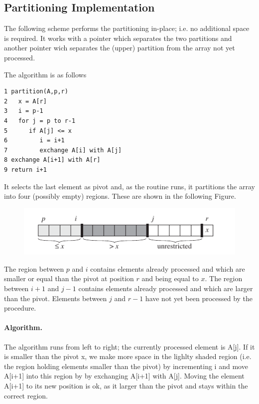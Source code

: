 \subsection{Partitioning Implementation}

The following scheme performs the partitioning in-place; i.e. no additional space is required. It works with a pointer which separates the two partitions and another pointer wich separates the (upper) partition from the array not yet processed.

The algorithm is as follows

\begin{verbatim}
1 partition(A,p,r)
2   x = A[r]
3   i = p-1
4   for j = p to r-1
5      if A[j] <= x
6         i = i+1
7         exchange A[i] with A[j]
8 exchange A[i+1] with A[r]
9 return i+1
\end{verbatim}

It selects the last element as pivot and, as the routine runs, it partitions the array into four (possibly empty) regions. These are shown in the following Figure.

\begin{figure}[hbt!]
\centering
\includegraphics[scale=0.7]{images/quicksort_1.png}
\end{figure}

The region between $p$ and $i$ contains elements already processed and which are smaller or equal than the pivot at position $r$ and being equal to $x$. The region between $i+1$ and $j-1$ contains elements already processed and which are larger than the pivot. Elements between $j$ and $r-1$ have not yet been processed by the procedure.

\paragraph{Algorithm.} The algorithm runs from left to right; the currently processed element is A[j]. If it is smaller than the pivot x, we make more space in the lighlty shaded region (i.e. the region holding elements smaller than the pivot) by incrementing i and move A[i+1] into this region by 
by exchanging A[i+1] with A[j]. Moving the element A[i+1] to its new position is ok, as it larger than the pivot and stays within the correct region.

